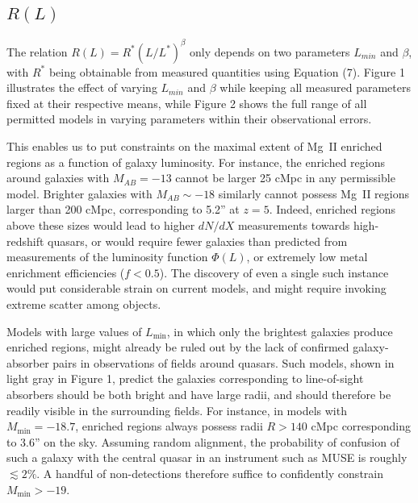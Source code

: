 \documentclass[useAMS,usenatbib]{mn2e}
\newcommand{\magtwo}{Mg~{\small II} }
\begin{document}
\subsection{$R(L)$}

The relation $R(L) = R^* (L/L^*)^\beta$ only depends on two parameters $L_{min}$ and $\beta$, with $R^*$ being obtainable from measured quantities using Equation (7). Figure 1 illustrates the effect of varying $L_{min}$ and $\beta$ while keeping all measured parameters fixed at their respective means, while Figure 2 shows the full range of all permitted models in varying parameters within their observational errors. 

This enables us to put constraints on the maximal extent of \magtwo enriched regions as a function of galaxy luminosity. For instance, the enriched regions around galaxies with $M_{AB} = -13$ cannot be larger 25 cMpc in any permissible model. Brighter galaxies with $M_{AB} \sim -18$ similarly cannot possess \magtwo regions larger than 200 cMpc, corresponding to 5.2'' at $z=5$. Indeed, enriched regions above these sizes would lead to higher $dN/dX$ measurements towards high-redshift quasars, or would require fewer galaxies than predicted from measurements of the luminosity function $\Phi(L)$, or extremely low metal enrichment efficiencies ($f<0.5$). The discovery of even a single such instance would put considerable strain on current models, and might require invoking extreme scatter among objects.

Models with large values of $L_\text{min}$, in which only the brightest galaxies produce enriched regions, might already be ruled out by the lack of confirmed galaxy-absorber pairs in observations of fields around quasars. Such models, shown in light gray in Figure 1, predict the galaxies corresponding to line-of-sight absorbers should be both bright and have large radii, and should therefore be readily visible in the surrounding fields. For instance, in models with $M_\text{min} = -18.7$, enriched regions always possess radii $R>140$ cMpc corresponding to 3.6'' on the sky. Assuming random alignment, the probability of confusion of such a galaxy with the central quasar in an instrument such as MUSE is roughly $\lesssim2\%$. A handful of non-detections therefore suffice to confidently constrain $M_\text{min} > -19$.

\end{document}
